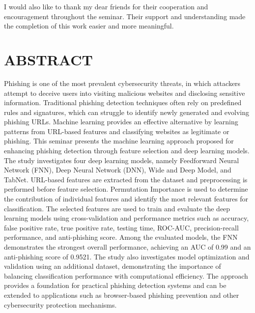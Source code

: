 \documentclass[12pt,a4paper]{report}
\begin{document}
I would also like to thank my dear friends for their cooperation and encouragement throughout the seminar. Their support and understanding made the completion of this work easier and more meaningful.

\newpage


\chapter*{ABSTRACT}


Phishing is one of the most prevalent cybersecurity threats, in which
attackers attempt to deceive users into visiting malicious websites
and disclosing sensitive information. Traditional phishing detection
techniques often rely on predefined rules and signatures, which can
struggle to identify newly generated and evolving phishing URLs.
Machine learning provides an effective alternative by learning
patterns from URL-based features and classifying websites as
legitimate or phishing.
This seminar presents the machine learning approach proposed for
enhancing phishing detection through feature selection and deep
learning models. The study investigates four deep learning models,
namely Feedforward Neural Network (FNN), Deep Neural Network (DNN),
Wide and Deep Model, and TabNet. URL-based features are extracted
from the dataset and preprocessing is performed before feature
selection. Permutation Importance is used to determine the
contribution of individual features and identify the most relevant
features for classification.
The selected features are used to train and evaluate the deep
learning models using cross-validation and performance metrics such
as accuracy, false positive rate, true positive rate, testing time,
ROC-AUC, precision-recall performance, and anti-phishing score.
Among the evaluated models, the FNN demonstrates the strongest
overall performance, achieving an AUC of 0.99 and an anti-phishing
score of 0.9521. The study also investigates model optimization and
validation using an additional dataset, demonstrating the importance
of balancing classification performance with computational
efficiency.
The approach provides a foundation for practical phishing detection
systems and can be extended to applications such as browser-based
phishing prevention and other cybersecurity protection mechanisms.
\end{document}
